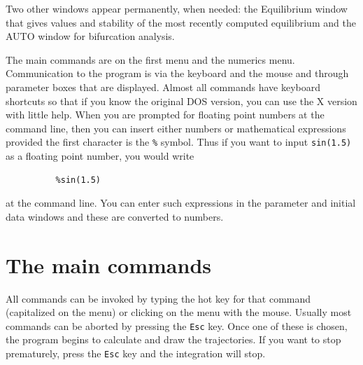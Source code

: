 \documentclass{article}
\newcommand{\bvb}{\begin{verbatim}}
\begin{document}
Two other windows appear permanently, when needed: the Equilibrium window
 that gives values and stability of the most recently computed
 equilibrium and the AUTO window for bifurcation analysis.


The main commands are on the first menu and the numerics menu.  Communication 
to the program is via the keyboard and the mouse and through parameter boxes
 that are displayed.  Almost all commands have keyboard shortcuts so that if
 you know the original DOS version, you can use the X version with little help.  
When you are prompted for floating point numbers at the command line, then 
you can insert either numbers or mathematical expressions provided the first
 character is the {\tt \%} symbol. Thus if you want to input {\tt sin(1.5)} as a floating 
point number, you would write
\bvb
          %sin(1.5)
\end{verbatim}
at the command line. You can enter such expressions in the parameter and
initial data windows and these are converted to numbers.  
 

\section{The main commands}
All commands can be invoked by typing the hot key for that command (capitalized
 on the menu) or clicking on the menu with the mouse.  Usually most commands can
 be aborted by pressing the {\tt Esc} key. Once one of these is chosen, the
 program begins to calculate and draw the trajectories.  If you want to
 stop prematurely, press the {\tt Esc} key and the integration will
stop. 
\end{document}

